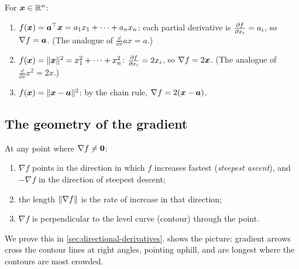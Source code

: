 \begin{example}\label{ex:vector-gradients}
For $\bm{x} \in \mathbb{R}^n$:
\begin{enumerate}
  \item $f(\bm{x}) = \bm{a}^\top\bm{x} = a_1x_1 + \dots + a_nx_n$: each partial derivative
    is $\frac{\partial f}{\partial x_i} = a_i$, so $\nabla f = \bm{a}$. (The analogue of
    $\frac{\dd}{\dd x}ax = a$.)
  \item $f(\bm{x}) = \lVert\bm{x}\rVert^2 = x_1^2 + \dots + x_n^2$: $\frac{\partial f}{\partial x_i} = 2x_i$,
    so $\nabla f = 2\bm{x}$. (The analogue of $\frac{\dd}{\dd x}x^2 = 2x$.)
  \item $f(\bm{x}) = \lVert\bm{x} - \bm{a}\rVert^2$: by the chain rule, $\nabla f = 2(\bm{x} - \bm{a})$.
\end{enumerate}
\end{example}

\subsection{The geometry of the gradient}

\begin{theorem}\label{thm:gradient-geometry}
At any point where $\nabla f \neq \bm{0}$:
\begin{enumerate}
  \item $\nabla f$ points in the direction in which $f$ increases fastest
    (\emph{steepest ascent}), and $-\nabla f$ in the direction of steepest
    descent;
  \item the length $\lVert\nabla f\rVert$ is the rate of increase in that direction;
  \item $\nabla f$ is perpendicular to the level curve (contour) through the
    point.
\end{enumerate}
\end{theorem}

We prove this in \cref{sec:directional-derivatives}. 
shows the picture: gradient arrows cross the contour lines at right angles,
pointing uphill, and are longest where the contours are most crowded.


